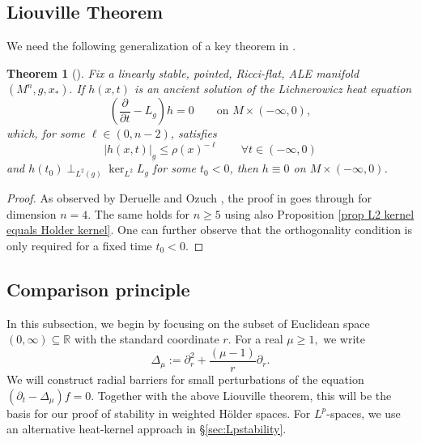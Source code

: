 \documentclass[12pt]{amsart}
\newcommand{\p}{{ \partial}}
\renewcommand{\1}{{\mathbf 1}}
\newcommand{\R}{{\mathbb R}}
\renewcommand{\p}{{\partial}}
\newtheorem{thm}{Theorem}[section]
\theoremstyle{others}
\numberwithin{equation}{section}
\begin{document}
\subsection{Liouville Theorem} We need the following generalization of a key theorem in \cite{BrendleKapouleas17}.

\begin{thm}[{\cite[Proposition 5.2]{BrendleKapouleas17}}] \label{thm:liouville}
    Fix a linearly stable, pointed, Ricci-flat, ALE manifold $(M^n,g, x_*).$ 
    If $h(x,t)$ is an ancient solution of the Lichnerowicz heat equation
        $$\left( \frac{\p}{\p t} - L_g \right) h = 0 \qquad \text{on } M \times(-\infty, 0),$$
    which, for some $\ell \in (0, n-2)$, satisfies
        $$|h(x,t)|_g \leq \rho(x)^{-\ell} \qquad \forall t \in (-\infty, 0)$$
    and $h(t_0) \perp_{L^2(g)} \ker_{L^2} L_g$ for some $t_0 < 0$, 
    then $h \equiv 0$ on $M \times (-\infty, 0)$.
\end{thm}
\begin{proof}
    As observed by Deruelle and Ozuch \cite[Prop. 5.3]{DeruelleOzuch25}, the proof in \cite[Prop. 5.2]{BrendleKapouleas17} goes through for dimension $n=4$. 
    The same holds for $n \ge 5$ using also Proposition \ref{prop L2 kernel equals Holder kernel}.
    One can further observe that the orthogonality condition is only required for a fixed time $t_0 < 0.$
\end{proof}













\subsection{Comparison principle}






    In this subsection, we begin by focusing on the subset of Euclidean space $(0, \infty) \subseteq \R$ with the standard coordinate $r$.
For a real $\mu \geq 1,$ we write
$$\Delta_\mu :=\p_r^2 + \frac{(\mu - 1)}{r} \p_r.$$
We will construct radial barriers for small perturbations of the equation $\left( \partial_t - \Delta_\mu \right) f = 0.$ %
Together with the above Liouville theorem, this will be the basis for our proof of stability in weighted H\"older spaces. For $L^p$-spaces, we use an alternative heat-kernel approach in \S \ref{sec:Lpstability}.
\end{document}
